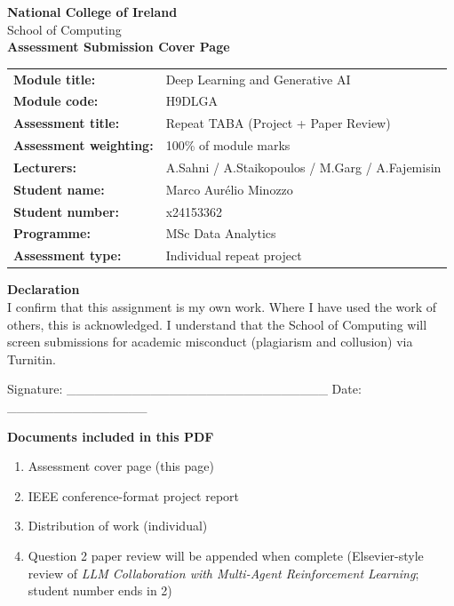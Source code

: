 \documentclass[11pt,a4paper]{article}
\begin{document}
\thispagestyle{empty}
\begin{center}
{\Large\textbf{National College of Ireland}}\\[0.4em]
{\large School of Computing}\\[2em]
{\LARGE\textbf{Assessment Submission Cover Page}}\\[2em]
\end{center}

\noindent
\begin{tabular}{@{}ll}
\textbf{Module title:} & Deep Learning and Generative AI \\
\textbf{Module code:} & H9DLGA \\
\textbf{Assessment title:} & Repeat TABA (Project + Paper Review) \\
\textbf{Assessment weighting:} & 100\% of module marks \\
\textbf{Lecturers:} & A.Sahni / A.Staikopoulos / M.Garg / A.Fajemisin \\[1em]
\textbf{Student name:} & Marco Aur\'{e}lio Minozzo \\
\textbf{Student number:} & x24153362 \\
\textbf{Programme:} & MSc Data Analytics \\
\textbf{Assessment type:} & Individual repeat project \\
\end{tabular}

\vspace{1.5em}
\noindent\textbf{Declaration}\\[0.5em]
I confirm that this assignment is my own work. Where I have used the work of others, this is acknowledged. I understand that the School of Computing will screen submissions for academic misconduct (plagiarism and collusion) via Turnitin.

\vspace{1.5em}
\noindent Signature: \_\_\_\_\_\_\_\_\_\_\_\_\_\_\_\_\_\_\_\_\_\_\_\_\_\_\_\_
\hfill Date: \_\_\_\_\_\_\_\_\_\_\_\_\_\_\_

\vspace{2em}
\noindent\textbf{Documents included in this PDF}\\[0.5em]
\begin{enumerate}
\item Assessment cover page (this page)
\item IEEE conference-format project report
\item Distribution of work (individual)
\item Question 2 paper review will be appended when complete (Elsevier-style review of \emph{LLM Collaboration with Multi-Agent Reinforcement Learning}; student number ends in 2)
\end{enumerate}
\end{document}
